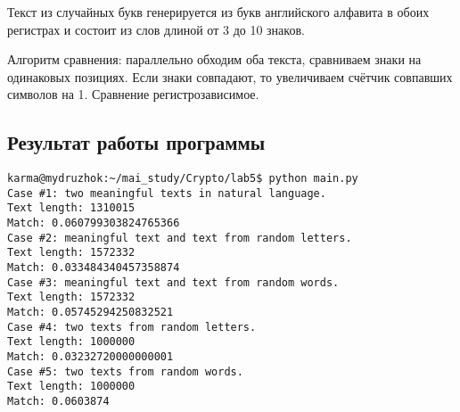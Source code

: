 \documentclass[12pt]{article}
\begin{document}
\par Текст из случайных букв генерируется из букв английского алфавита в обоих регистрах и состоит из слов длиной от 3 до 10 знаков.

\par Алгоритм сравнения: параллельно обходим оба текста, сравниваем знаки на одинаковых позициях. Если знаки совпадают, то увеличиваем счётчик совпавших символов на 1. Сравнение регистрозависимое.



\subsection*{Результат работы программы}
\begin{lstlisting}
karma@mydruzhok:~/mai_study/Crypto/lab5$ python main.py
Case #1: two meaningful texts in natural language.
Text length: 1310015
Match: 0.060799303824765366
Case #2: meaningful text and text from random letters.
Text length: 1572332
Match: 0.033484340457358874
Case #3: meaningful text and text from random words.
Text length: 1572332
Match: 0.05745294250832521
Case #4: two texts from random letters.
Text length: 1000000
Match: 0.03232720000000001
Case #5: two texts from random words.
Text length: 1000000
Match: 0.0603874
\end{lstlisting}
\end{document}
